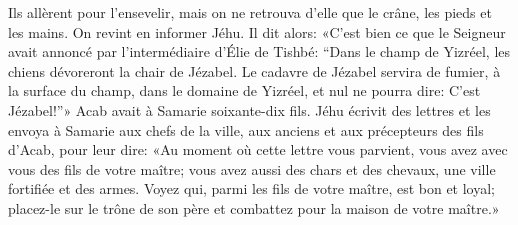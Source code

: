 Ils allèrent pour l’ensevelir,
	mais on ne retrouva d’elle que le crâne, les pieds et les mains.
On revint en informer Jéhu.
Il dit alors:
	«C’est bien ce que le Seigneur avait annoncé par l’intermédiaire d’Élie de Tishbé:
	“Dans le champ de Yizréel, les chiens dévoreront la chair de Jézabel.
	Le cadavre de Jézabel servira de fumier,
		à la surface du champ, dans le domaine de Yizréel,
	et nul ne pourra dire: C’est Jézabel!”»
Acab avait à Samarie soixante-dix fils.
Jéhu écrivit des lettres et les envoya à Samarie aux chefs de la ville,
	aux anciens et aux précepteurs des fils d’Acab, pour leur dire:
	«Au moment où cette lettre vous parvient,
	vous avez avec vous des fils de votre maître;
	vous avez aussi des chars et des chevaux, une ville fortifiée et des armes.
Voyez qui, parmi les fils de votre maître, est bon et loyal;
	placez-le sur le trône de son père et combattez pour la maison de votre maître.»
